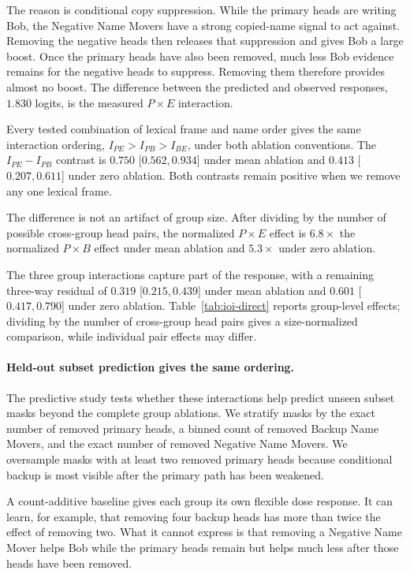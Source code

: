 \documentclass[sigconf,10pt,nonacm,balance=false]{acmart}
\begin{document}
The reason is conditional copy suppression. While the primary heads are writing Bob, the Negative Name Movers have a strong copied-name signal to act against. Removing the negative heads then releases that suppression and gives Bob a large boost. Once the primary heads have also been removed, much less Bob evidence remains for the negative heads to suppress. Removing them therefore provides almost no boost. The difference between the predicted and observed responses, $1.830$ logits, is the measured $P\times E$ interaction.

Every tested combination of lexical frame and name order gives the same interaction ordering, $I_{PE}>I_{PB}>I_{BE}$, under both ablation conventions. The $I_{PE}-I_{PB}$ contrast is $0.750$ [$0.562,0.934$] under mean ablation and $0.413$ [$0.207,0.611$] under zero ablation. Both contrasts remain positive when we remove any one lexical frame.

The difference is not an artifact of group size. After dividing by the number of possible cross-group head pairs, the normalized $P\times E$ effect is $6.8\times$ the normalized $P\times B$ effect under mean ablation and $5.3\times$ under zero ablation.

The three group interactions capture part of the response, with a remaining three-way residual of $0.319$ [$0.215,0.439$] under mean ablation and $0.601$ [$0.417,0.790$] under zero ablation. Table~\ref{tab:ioi-direct} reports group-level effects; dividing by the number of cross-group head pairs gives a size-normalized comparison, while individual pair effects may differ.

\paragraph{Held-out subset prediction gives the same ordering.}

The predictive study tests whether these interactions help predict unseen subset masks beyond the complete group ablations. We stratify masks by the exact number of removed primary heads, a binned count of removed Backup Name Movers, and the exact number of removed Negative Name Movers. We oversample masks with at least two removed primary heads because conditional backup is most visible after the primary path has been weakened.

A count-additive baseline gives each group its own flexible dose response. It can learn, for example, that removing four backup heads has more than twice the effect of removing two. What it cannot express is that removing a Negative Name Mover helps Bob while the primary heads remain but helps much less after those heads have been removed.
\end{document}
